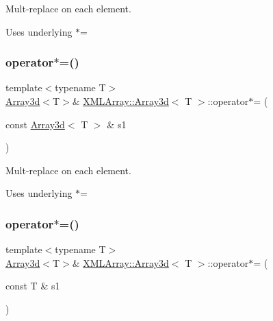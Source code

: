 Mult-\/replace on each element. 

Uses underlying $\ast$= \mbox{\label{classXMLArray_1_1Array3d_a8084893bc2fd7c37f656d6eec21189eb}} 
\subsubsection{\texorpdfstring{operator$\ast$=()}{operator*=()}\hspace{0.1cm}{\footnotesize\ttfamily [2/4]}}
{\footnotesize\ttfamily template$<$typename T$>$ \\
\mbox{\hyperlink{classXMLArray_1_1Array3d}{Array3d}}$<$T$>$\& \mbox{\hyperlink{classXMLArray_1_1Array3d}{X\+M\+L\+Array\+::\+Array3d}}$<$ T $>$\+::operator$\ast$= (\begin{DoxyParamCaption}\item[{const \mbox{\hyperlink{classXMLArray_1_1Array3d}{Array3d}}$<$ T $>$ \&}]{s1 }\end{DoxyParamCaption})\hspace{0.3cm}{\ttfamily [inline]}}



Mult-\/replace on each element. 

Uses underlying $\ast$= \mbox{\label{classXMLArray_1_1Array3d_aff3679dabbd2691243dce85defb9519d}} 
\subsubsection{\texorpdfstring{operator$\ast$=()}{operator*=()}\hspace{0.1cm}{\footnotesize\ttfamily [3/4]}}
{\footnotesize\ttfamily template$<$typename T$>$ \\
\mbox{\hyperlink{classXMLArray_1_1Array3d}{Array3d}}$<$T$>$\& \mbox{\hyperlink{classXMLArray_1_1Array3d}{X\+M\+L\+Array\+::\+Array3d}}$<$ T $>$\+::operator$\ast$= (\begin{DoxyParamCaption}\item[{const T \&}]{s1 }\end{DoxyParamCaption})\hspace{0.3cm}{\ttfamily [inline]}}



